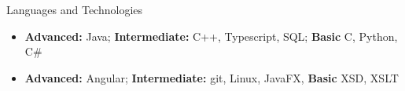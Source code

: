 \documentclass[]{style}
\begin{document}
	\begin{cvsection}{Languages and Technologies}
		\begin{cvsubsection}{}{}{}	
			\begin{itemize}
				\item \textbf{Advanced:} Java; \textbf{Intermediate:} C++, Typescript, SQL; \textbf{Basic} C, Python, C\# 
				\item \textbf{Advanced:} Angular; \textbf{Intermediate:} git, Linux, JavaFX, \textbf{Basic} XSD, XSLT
			\end{itemize}
		\end{cvsubsection}
	\end{cvsection}
	
\end{document}
